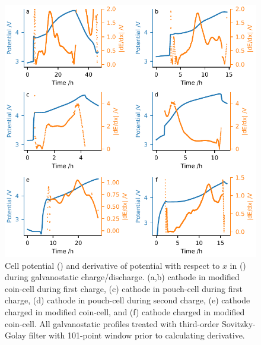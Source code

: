 \documentclass{article}
\begin{document}
\begin{figure}
  \includegraphics{figures/echem-derivatives.pdf}
  \caption{Cell potential (\textcolor{C0}{\mplline{}}) and derivative
    of potential with respect to $x$ in 
    (\textcolor{C1}{\mpldots}) during galvanostatic
    charge/discharge. (a,b) \nmc[333]{} cathode in modified coin-cell
    during first charge, (c) \nca{} cathode in pouch-cell during first
    charge, (d) \nca{} cathode in pouch-cell during second charge, (e)
    \nca{} cathode charged in modified coin-cell, and (f) \nmc[532]{}
    cathode charged in modified coin-cell. All galvanostatic profiles
    treated with third-order Sovitzky-Golay filter with 101-point
    window prior to calculating derivative.}
  \label{fig:echem-derivatives}
\end{figure}
\end{document}
